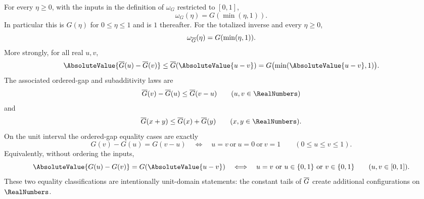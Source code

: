 \begin{theorem}\label{co:thm:exact-inverse-modulus}
For every $\eta\ge0$, with the inputs in the definition of $\omega_G$
restricted to $[0,1]$,
\begin{equation}\label{co:eq:exact-inverse-modulus}
 \omega_G(\eta)=G(\min(\eta,1)).
\end{equation}
In particular this is $G(\eta)$ for $0\le\eta\le1$ and is $1$ thereafter.
For the totalized inverse and every $\eta\ge0$,
\begin{equation}\label{co:eq:exact-total-modulus}
 \omega_{\overline G}(\eta)=G(\min(\eta,1)).
\end{equation}
More strongly, for all real $u,v$,
\begin{equation}\label{co:eq:absolute-inverse-gap-bound}
 \AbsoluteValue{\InvT(u)-\InvT(v)}
 \le \InvT(\AbsoluteValue{u-v})
 =G\bigl(\min(\AbsoluteValue{u-v},1)\bigr).
\end{equation}
The associated ordered-gap and subadditivity laws are
\begin{equation}\label{co:eq:inverse-gap-bound}
 \InvT(v)-\InvT(u)\le \InvT(v-u)
 \qquad(u,v\in\RealNumbers)
\end{equation}
and
\begin{equation}\label{co:eq:inverse-subadditive}
 \InvT(x+y)\le\InvT(x)+\InvT(y)
 \qquad(x,y\in\RealNumbers).
\end{equation}
On the unit interval the ordered-gap equality cases are exactly
\begin{equation}\label{co:eq:inverse-gap-equality}
 G(v)-G(u)=G(v-u)
 \quad\Longleftrightarrow\quad
 u=v\ \text{or}\ u=0\ \text{or}\ v=1
 \qquad(0\le u\le v\le1).
\end{equation}
Equivalently, without ordering the inputs,
\begin{equation}\label{co:eq:absolute-inverse-gap-equality}
 \AbsoluteValue{G(u)-G(v)}=G(\AbsoluteValue{u-v})
 \quad\Longleftrightarrow\quad
 u=v\ \text{or}\ u\in\{0,1\}\ \text{or}\ v\in\{0,1\}
 \qquad(u,v\in[0,1]).
\end{equation}
These two equality classifications are intentionally unit-domain statements:
the constant tails of $\overline G$ create additional configurations on $\RealNumbers$.
\end{theorem}

